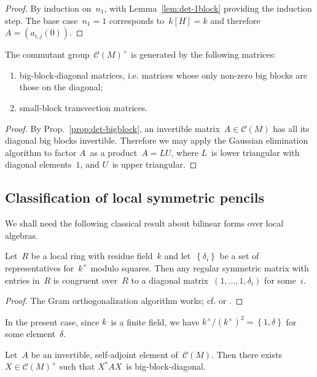 \documentclass{lms}%
\let\ro\mathscr
\def\acco#1{\left\{#1\right\}}
\begin{document}
\begin{proof}
By induction on~$n_1$, with Lemma~\ref{lem:det-1block} providing the
induction step. The base case~$n_1 = 1$ corresponds to~$k[H] = k$ and
therefore~$A = (a_{i,j}(0))$.
\end{proof}
\begin{prop}\label{prop:structure-gl}%
The commutant group~$\ro C(M)^{×}$ is
generated by the following matrices:
\begin{enumerate}
\item big-block-diagonal matrices, i.e. matrices whose only non-zero big
blocks are those on the diagonal;
\item small-block transvection matrices.
\end{enumerate}
\end{prop}

\begin{proof}
By Prop.~\ref{prop:det-bigblock}, an invertible matrix~$A ∈ \ro C(M)$ has
all its diagonal big blocks invertible. Therefore we may apply the
Gaussian elimination algorithm to factor $A$~as a product~$A = LU$, where
$L$~is lower triangular with diagonal elements~$1$, and $U$~is upper
triangular.
\end{proof}%

\subsection{Classification of local symmetric pencils}%

We shall need the following classical result about bilinear forms over
local algebras.

\begin{prop}\label{prop:local-diag}%
Let~$R$ be a local ring with residue field~$k$ and let~$\acco{δ_i}$ be a
set of representatives for~$k^{×}$ modulo squares. Then any regular
symmetric matrix with entries in~$R$ is congruent over~$R$ to a
diagonal matrix~$(1, …, 1, δ_i)$ for some~$i$.
\end{prop}

\begin{proof}
The Gram orthogonalization algorithm works; cf.
\cite[I(3.4)]{milnorhusemoller} or \cite[92:1]{omeara}.
\end{proof}

In the present case, since $k$~is a finite field, we have $k^{×} /
(k^{×})^2 = \acco {1, δ}$ for some element~$δ$.
\begin{prop}\label{prop:bb-diag}%
Let~$A$ be an invertible, self-adjoint element of~$\ro C(M)$. Then there
exists $X ∈ \ro C(M)^{×}$ such that $X^{*} A X$~is big-block-diagonal.
\end{prop}
\end{document}
